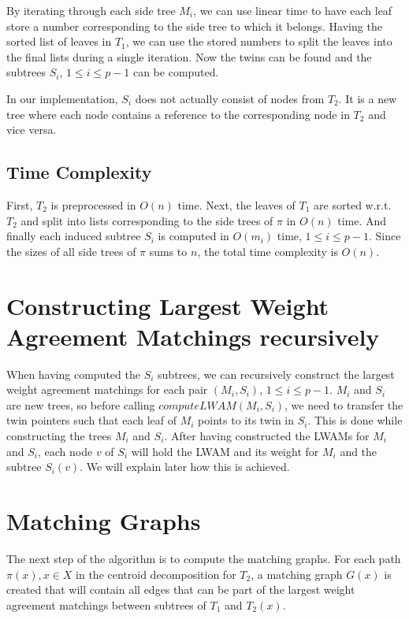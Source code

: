 By iterating through each side tree $M_i$, we can use linear time to have each leaf store a number corresponding to the side tree to which it belongs. Having the sorted list of leaves in $T_1$, we can use the stored numbers to split the leaves into the final lists during a single iteration. Now the twins can be found and the subtrees $S_i$, $1 \le i \le p-1$ can be computed.

In our implementation, $S_i$ does not actually consist of nodes from $T_2$. It is a new tree where each node contains a reference to the corresponding node in $T_2$ and vice versa.

\subsection{Time Complexity}
First, $T_2$ is preprocessed in $O(n)$ time. Next, the leaves of $T_1$ are sorted w.r.t. $T_2$ and split into lists corresponding to the side trees of $\pi$ in $O(n)$ time. And finally each induced subtree $S_i$ is computed in $O(m_i)$ time, $1 \le i \le p-1$. Since the sizes of all side trees of $\pi$ sums to $n$, the total time complexity is $O(n)$.

\section{Constructing Largest Weight Agreement Matchings recursively}
When having computed the $S_i$ subtrees, we can recursively construct the largest weight agreement matchings for each pair $(M_i, S_i)$, $1 \le i \le p-1$. $M_i$ and $S_i$ are new trees, so before calling $computeLWAM(M_i, S_i)$, we need to transfer the twin pointers such that each leaf of $M_i$ points to its twin in $S_i$. This is done while constructing the trees $M_i$ and $S_i$.
After having constructed the LWAMs for $M_i$ and $S_i$, each node $v$ of $S_i$ will hold the LWAM and its weight for $M_i$ and the subtree $S_i(v)$. We will explain later how this is achieved.

\section{Matching Graphs}
The next step of the algorithm is to compute the matching graphs. For each path $\pi(x), x \in X$ in the centroid decomposition for $T_2$, a matching graph $G(x)$ is created that will contain all edges that can be part of the largest weight agreement matchings between subtrees of $T_1$ and $T_2(x)$.

